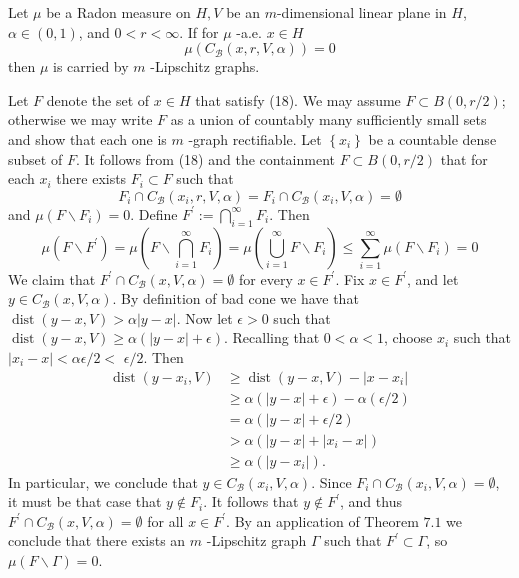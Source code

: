 \begin{corollary}[Corollary 7.1]
 Let $\mu$ be a Radon measure on $H, V$ be an $m$-dimensional linear plane in $H$, $\alpha \in(0,1)$, and $0<r<\infty$. If for $\mu$ -a.e. $x \in H$
$$
\mu\left(C_{\mathcal{B}}(x, r, V, \alpha)\right)=0
$$
then $\mu$ is carried by $m$ -Lipschitz graphs.
\end{corollary}
\proof Let $F$ denote the set of $x \in H$ that satisfy (18). We may assume $F \subset B(0, r / 2)$; otherwise we may write $F$ as a union of countably many sufficiently small sets and show that each one is $m$ -graph rectifiable. Let $\left\{x_{i}\right\}$ be a countable dense subset of $F .$ It follows from (18) and the containment $F \subset B(0, r / 2)$ that for each $x_{i}$ there exists $F_{i} \subset F$ such that
$$
F_{i} \cap C_{\mathcal{B}}\left(x_{i}, r, V, \alpha\right)=F_{i} \cap C_{\mathcal{B}}\left(x_{i}, V, \alpha\right)=\emptyset
$$
and $\mu\left(F \backslash F_{i}\right)=0$. Define $F^{\prime}:=\bigcap_{i=1}^{\infty} F_{i}$. Then
$$
\mu\left(F \backslash F^{\prime}\right)=\mu\left(F \backslash \bigcap_{i=1}^{\infty} F_{i}\right)=\mu\left(\bigcup_{i=1}^{\infty} F \backslash F_{i}\right) \leq \sum_{i=1}^{\infty} \mu\left(F \backslash F_{i}\right)=0
$$
We claim that $F^{\prime} \cap C_{\mathcal{B}}(x, V, \alpha)=\emptyset$ for every $x \in F^{\prime} .$ Fix $x \in F^{\prime}$, and let $y \in C_{\mathcal{B}}(x, V, \alpha)$.
By definition of bad cone we have that $\operatorname{dist}(y-x, V)>\alpha|y-x|$. Now let $\epsilon>0$ such that $\operatorname{dist}(y-x, V) \geq \alpha(|y-x|+\epsilon)$. Recalling that $0<\alpha<1$, choose $x_{i}$ such that $\left|x_{i}-x\right|<\alpha \epsilon / 2<$
$\epsilon / 2 .$ Then
$$
\begin{aligned}
\operatorname{dist}\left(y-x_{i}, V\right) & \geq \operatorname{dist}(y-x, V)-\left|x-x_{i}\right| \\
& \geq \alpha(|y-x|+\epsilon)-\alpha(\epsilon / 2) \\
&=\alpha(|y-x|+\epsilon / 2) \\
&>\alpha\left(|y-x|+\left|x_{i}-x\right|\right) \\
& \geq \alpha\left(\left|y-x_{i}\right|\right) .
\end{aligned}
$$
In particular, we conclude that $y \in C_{\mathcal{B}}\left(x_{i}, V, \alpha\right) .$ Since $F_{i} \cap C_{\mathcal{B}}\left(x_{i}, V, \alpha\right)=\emptyset$, it must be that case that $y \notin F_{i}$. It follows that $y \notin F^{\prime}$, and thus $F^{\prime} \cap C_{\mathcal{B}}(x, V, \alpha)=\emptyset$ for all $x \in F^{\prime}$. By an application of Theorem $7.1$ we conclude that there exists an $m$ -Lipschitz graph $\Gamma$ such that $F^{\prime} \subset \Gamma$, so $\mu(F \backslash \Gamma)=0$.

